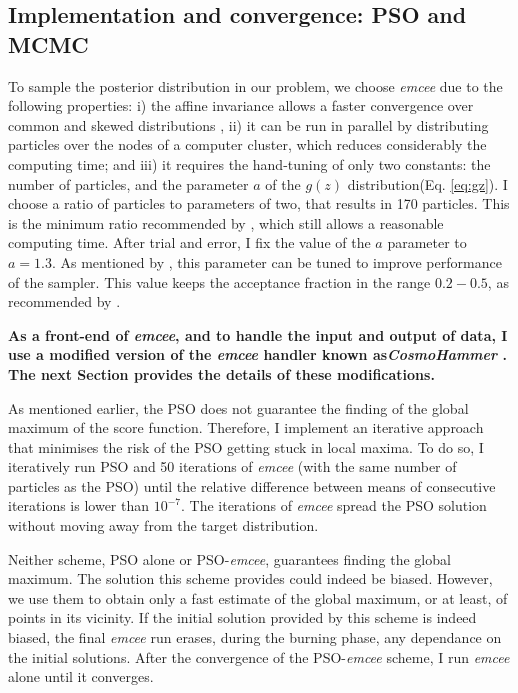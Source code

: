 \subsection{Implementation and convergence: PSO and MCMC}
To sample the posterior distribution in our problem, we choose \emph{emcee} due to the following properties: i) the affine invariance allows a faster convergence over common and skewed distributions \cite[see][for details]{Goodman2010,Foreman2013}, ii) it can be run in parallel by distributing particles over the nodes of a computer cluster, which reduces considerably the computing time; and iii) it requires the hand-tuning of only two constants: the number of particles, and the parameter $a$ of the $g(z)$ distribution(Eq. \ref{eq:gz}). I choose a ratio of particles to parameters of two, that results in 170 particles. This is the minimum ratio recommended by \citet{Foreman2013}, which still allows a reasonable computing time. After trial and error, I fix the value of the $a$ parameter to $a=1.3$. As mentioned by \citet{Goodman2010}, this parameter can be tuned to improve performance of the sampler. This value keeps the acceptance fraction in the range $0.2-0.5$, as recommended by \citet{Foreman2013}.

\textbf{As a front-end of \emph{emcee}, and to handle the input and output of data, I use a modified version of the \emph{emcee} handler known as\emph{CosmoHammer} \citep{Akeret2013}. The next Section provides the details of these modifications. }

As mentioned earlier, the PSO does not guarantee the finding of the global maximum of the score function. Therefore, I implement an iterative approach that minimises the risk of the PSO getting stuck in local maxima. To do so, I iteratively run PSO and 50 iterations of \emph{emcee} (with the same number of particles as the PSO) until the relative difference between means of consecutive iterations is lower than $10^{-7}$. The iterations of \emph{emcee} spread the PSO solution without moving away from the target distribution. 
 
Neither scheme, PSO alone or PSO-\emph{emcee}, guarantees finding the global maximum. The solution this scheme provides could indeed be biased. However, we use them to obtain only a fast estimate of the global maximum, or at least, of points in its vicinity. If the initial solution provided by this scheme is indeed biased, the final \emph{emcee} run erases, during the burning phase, any dependance on the initial solutions. After the convergence of the PSO-\emph{emcee} scheme, I run \emph{emcee} alone until it converges.  
 
